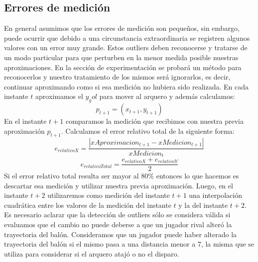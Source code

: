 \subsection{Errores de medición}\label{ssec:errores_de_medicion}
En general asumimos que los errores de medición son pequeños, sin embargo, puede ocurrir que debido a una circunstancia extraordinaria
se registren algunos valores con un error muy grande. Estos outliers deben reconocerse y tratarse de un modo particular para que perturben en
la menor medida posible nuestras aproximaciones. En la sección de experimentación se probará un método para reconocerlos y nuestro 
tratamiento de los mismos será ignorarlos, es decir, continuar aproximando como si esa medición no hubiera sido realizada.  En cada instante $t$ 
aproximamos el $y_gol$ para mover al arquero y además calculamos: 
\begin{displaymath}
	p_{t+1} = (x_{t+1}, y_{t+1})
\end{displaymath}
En el instante $t+1$ comparamos la medición que recibimos con nuestra previa aproximación $p_{t+1}$. Calculamos el error relativo total de la siguiente
forma:
\begin{displaymath}
	e_{relativoX} = \frac{|xAproximacion_{t+1} - xMedicion_{t+1}|}{xMedicion_{t}}
\end{displaymath}
\begin{displaymath}
	e_{relativoTotal} = \frac{e_{relativoX} + e_{relativoY}}{2}
\end{displaymath}
Si el error relativo total resulta ser mayor al $80\%$ entonces lo que hacemos es descartar esa medición y utilizar nuestra previa aproximación. Luego,
en el instante $t+2$ utilizaremos como medición del instante $t+1$ una interpolación cuadrática entre los valores de la medición del instante $t$ y 
la del instante $t+2$. Es necesario aclarar que la detección de outliers sólo se considera válida si evaluamos que el cambio no puede deberse a que un jugador rival
alteró la trayectoria del balón. Consideramos que un jugador puede haber alterado la trayectoria del balón si el mismo pasa a una distancia menor a 7, la misma
que se utiliza para considerar si el arquero atajó o no el disparo.

